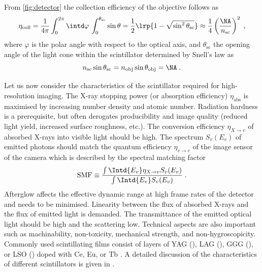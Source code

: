 \documentclass[
twoside,
openright,
titlepage,
numbers=noenddot,
headinclude,
fleqn,
a4paper,
footinclude=true,
cleardoublepage=empty,
abstractoff,
BCOR=5mm,
paper=a4,
fontsize=11pt,
british,ngerman,american,
]{scrreprt}
\begin{document}

From \cref{fig:detector} the collection efficiency of the objective
follows as
\begin{equation}
  \label{eq:collection-efficiency}
  \eta_{\mathrm{coll}} = 
  \frac{1}{4\pi}\int_0^{2\pi}\intd
  \varphi\,\int_0^{\theta_{\mathrm{sc}}}\sin\theta
  = \frac12\lrp{1 - \sqrt{\sin^2\theta_\mathrm{sc}} }
  \approx\frac{1}{4}\left(\frac{\NA}{n_{\mathrm{sc}}}\right)^2\;,
\end{equation}
where $\varphi$ is the polar angle with respect to the optical axis,
and $\theta_{\mathrm{sc}}$ the opening angle of the light cone within
the scintillator determined by Snell's law as
\begin{equation}
  \label{eq:snell-law}
  n_{\mathrm{sc}}\sin\theta_{\mathrm{sc}} =
  n_{\mathrm{obj}}\sin\theta_{\mathrm{obj}} = \NA\;.
\end{equation}

Let us now consider the characteristics of the scintillator required
for high-resolution imaging.  The X-ray stopping power (or absorption
efficiency) $\eta_{\mathrm{abs}}$ is maximised by increasing number
density and atomic number.  Radiation hardness is a prerequisite, but
often derogates producibility and image quality (reduced light yield,
increased surface roughness, etc.).  The conversion efficiency
$\eta_{X\to v}$ of absorbed X-rays into visible light should be high.
The spectrum $S_{v}(E_v)$ of emitted photons should match the quantum
efficiency $\eta_{v\to e}$ of the image sensor of the camera which is
described by the spectral matching factor
\begin{equation}
  \label{eq:smf}
  \operatorname{SMF} \equiv 
  \frac{\int\Intd{E_v}\eta_{X\to v}S_{v}(E_v)}
  {\int\Intd{E_v}S_{v}(E_v)} \;.
\end{equation}
Afterglow affects the effective dynamic range at high frame rates of
the detector and needs to be minimised.  Linearity between the flux of
absorbed X-rays and the flux of emitted light is demanded.  The
transmittance of the emitted optical light should be high and the
scattering low.  Technical aspects are also important such as
machinability, non-toxicity, mechanical strength, and
non-hygroscopicity.  Commonly used scintillating films consist of
layers of \eg{} YAG (), LAG
(), GGG (), or LSO
() %
doped with Ce, Eu, or Tb %
\cite{Martin2009,Cecilia2011}.  A detailed discussion of the
characteristics of different scintillators is given in
\cite{Martin2006,Martin2009,Cecilia2011}.
\end{document}
